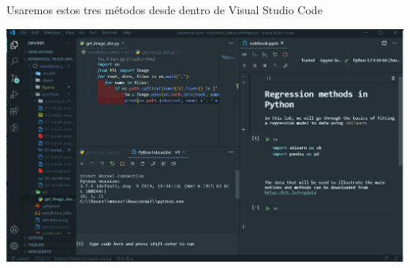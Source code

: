 \documentclass[9pt]{beamer}
\begin{document}
          \begin{frame}{Usaremos estos tres métodos desde dentro de  Visual Studio Code}
            \begin{center}
              \includegraphics[width=1.05\textwidth]{visual_studio_code_three_methods}
            \end{center}
          \end{frame}
          

        
\end{document}
